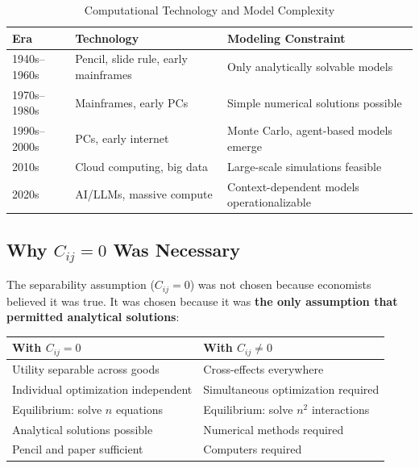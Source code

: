 \documentclass[12pt,a4paper]{article}
\begin{document}
\begin{table}[H]
\centering
\caption{Computational Technology and Model Complexity}
\label{tab:tech-constraints}
\renewcommand{\arraystretch}{1.3}
\small
\begin{tabular}{@{}lll@{}}
\toprule
\textbf{Era} & \textbf{Technology} & \textbf{Modeling Constraint} \\
\midrule
1940s--1960s & Pencil, slide rule, early mainframes & Only analytically solvable models \\
1970s--1980s & Mainframes, early PCs & Simple numerical solutions possible \\
1990s--2000s & PCs, early internet & Monte Carlo, agent-based models emerge \\
2010s & Cloud computing, big data & Large-scale simulations feasible \\
2020s & AI/LLMs, massive compute & Context-dependent models operationalizable \\
\bottomrule
\end{tabular}
\end{table}

\subsection{Why $C_{ij} = 0$ Was Necessary}

The separability assumption ($C_{ij} = 0$) was not chosen because economists believed it was true. It was chosen because it was \textbf{the only assumption that permitted analytical solutions}:

\begin{table}[H]
\centering
\renewcommand{\arraystretch}{1.3}
\begin{tabular}{@{}p{5.5cm}p{5.5cm}@{}}
\toprule
\textbf{With $C_{ij} = 0$} & \textbf{With $C_{ij} \neq 0$} \\
\midrule
Utility separable across goods & Cross-effects everywhere \\
Individual optimization independent & Simultaneous optimization required \\
Equilibrium: solve $n$ equations & Equilibrium: solve $n^2$ interactions \\
Analytical solutions possible & Numerical methods required \\
Pencil and paper sufficient & Computers required \\
\bottomrule
\end{tabular}
\end{table}
\end{document}
